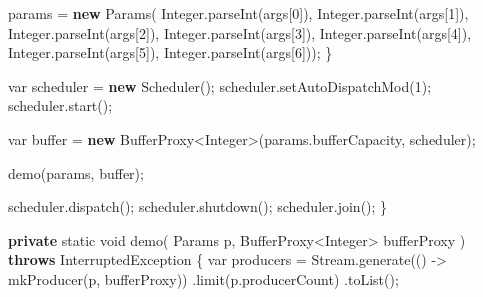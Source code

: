 \documentclass[11pt]{article}
\newenvironment{Shaded}{}{}
\newcommand{\KeywordTok}[1]{\textcolor[rgb]{0.00,0.44,0.13}{\textbf{{#1}}}}
\newcommand{\DataTypeTok}[1]{\textcolor[rgb]{0.56,0.13,0.00}{{#1}}}
\newcommand{\DecValTok}[1]{\textcolor[rgb]{0.25,0.63,0.44}{{#1}}}
\newcommand{\FunctionTok}[1]{\textcolor[rgb]{0.02,0.16,0.49}{{#1}}}
\newcommand{\NormalTok}[1]{{#1}}
\newcommand{\OperatorTok}[1]{\textcolor[rgb]{0.40,0.40,0.40}{{#1}}}
\newcommand{\BuiltInTok}[1]{{#1}}
\begin{document}
\begin{Shaded}
\begin{Highlighting}[]
\NormalTok{            params }\OperatorTok{=} \KeywordTok{new} \FunctionTok{Params}\OperatorTok{(}
                    \BuiltInTok{Integer}\OperatorTok{.}\FunctionTok{parseInt}\OperatorTok{(}\NormalTok{args}\OperatorTok{[}\DecValTok{0}\OperatorTok{]),}
                    \BuiltInTok{Integer}\OperatorTok{.}\FunctionTok{parseInt}\OperatorTok{(}\NormalTok{args}\OperatorTok{[}\DecValTok{1}\OperatorTok{]),}
                    \BuiltInTok{Integer}\OperatorTok{.}\FunctionTok{parseInt}\OperatorTok{(}\NormalTok{args}\OperatorTok{[}\DecValTok{2}\OperatorTok{]),}
                    \BuiltInTok{Integer}\OperatorTok{.}\FunctionTok{parseInt}\OperatorTok{(}\NormalTok{args}\OperatorTok{[}\DecValTok{3}\OperatorTok{]),}
                    \BuiltInTok{Integer}\OperatorTok{.}\FunctionTok{parseInt}\OperatorTok{(}\NormalTok{args}\OperatorTok{[}\DecValTok{4}\OperatorTok{]),}
                    \BuiltInTok{Integer}\OperatorTok{.}\FunctionTok{parseInt}\OperatorTok{(}\NormalTok{args}\OperatorTok{[}\DecValTok{5}\OperatorTok{]),}
                    \BuiltInTok{Integer}\OperatorTok{.}\FunctionTok{parseInt}\OperatorTok{(}\NormalTok{args}\OperatorTok{[}\DecValTok{6}\OperatorTok{]));}
        \OperatorTok{\}}

        \DataTypeTok{var}\NormalTok{ scheduler }\OperatorTok{=} \KeywordTok{new} \FunctionTok{Scheduler}\OperatorTok{();}
\NormalTok{        scheduler}\OperatorTok{.}\FunctionTok{setAutoDispatchMod}\OperatorTok{(}\DecValTok{1}\OperatorTok{);}
\NormalTok{        scheduler}\OperatorTok{.}\FunctionTok{start}\OperatorTok{();}

        \DataTypeTok{var}\NormalTok{ buffer }\OperatorTok{=} \KeywordTok{new}\NormalTok{ BufferProxy}\OperatorTok{\textless{}}\BuiltInTok{Integer}\OperatorTok{\textgreater{}(}\NormalTok{params}\OperatorTok{.}\FunctionTok{bufferCapacity}\OperatorTok{,}\NormalTok{ scheduler}\OperatorTok{);}

        \FunctionTok{demo}\OperatorTok{(}\NormalTok{params}\OperatorTok{,}\NormalTok{ buffer}\OperatorTok{);}

\NormalTok{        scheduler}\OperatorTok{.}\FunctionTok{dispatch}\OperatorTok{();}
\NormalTok{        scheduler}\OperatorTok{.}\FunctionTok{shutdown}\OperatorTok{();}
\NormalTok{        scheduler}\OperatorTok{.}\FunctionTok{join}\OperatorTok{();}
    \OperatorTok{\}}

    \KeywordTok{private} \DataTypeTok{static} \DataTypeTok{void} \FunctionTok{demo}\OperatorTok{(}
\NormalTok{        Params p}\OperatorTok{,}
\NormalTok{        BufferProxy}\OperatorTok{\textless{}}\BuiltInTok{Integer}\OperatorTok{\textgreater{}}\NormalTok{ bufferProxy}
    \OperatorTok{)} \KeywordTok{throws} \BuiltInTok{InterruptedException} \OperatorTok{\{}
        \DataTypeTok{var}\NormalTok{ producers }\OperatorTok{=}\NormalTok{ Stream}\OperatorTok{.}\FunctionTok{generate}\OperatorTok{(()} \OperatorTok{{-}\textgreater{}} \FunctionTok{mkProducer}\OperatorTok{(}\NormalTok{p}\OperatorTok{,}\NormalTok{ bufferProxy}\OperatorTok{))}
                \OperatorTok{.}\FunctionTok{limit}\OperatorTok{(}\NormalTok{p}\OperatorTok{.}\FunctionTok{producerCount}\OperatorTok{)}
                \OperatorTok{.}\FunctionTok{toList}\OperatorTok{();}


\end{Highlighting}
\end{Shaded}
\end{document}
